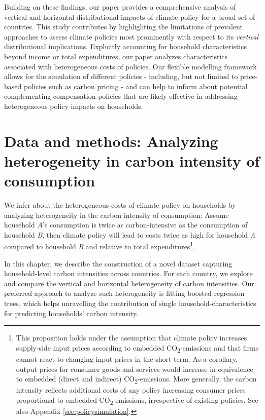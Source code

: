 \documentclass[12pt, a4paper]{article}
\begin{document}
Building on these findings, our paper provides a comprehensive analysis of vertical and horizontal distributional impacts of climate policy for a broad set of countries. This study contributes by highlighting the limitations of prevalent approaches to assess climate policies most prominently with respect to its \textit{vertical} distributional implications. Explicitly accounting for household characteristics beyond income or total expenditures, our paper analyzes characteristics associated with heterogeneous costs of policies. Our flexible modelling framework allows for the simulation of different policies - including, but not limited to price-based policies such as carbon pricing - and can help to inform about potential complementing compensation policies that are likely effective in addressing heterogeneous policy impacts on households.

\section{Data and methods: Analyzing heterogeneity in carbon intensity of consumption} \label{sec:data_methods}

We infer about the heterogeneous costs of climate policy on households by analyzing heterogeneity in the carbon intensity of consumption: Assume household \textit{A}'s consumption is twice as carbon-intensive as the consumption of household \textit{B}, then climate policy will lead to costs twice as high for household \textit{A} compared to household \textit{B} and relative to total expenditures\footnote{This proposition holds under the assumption that climate policy increases supply-side input prices according to embedded CO\textsubscript{2}-emissions and that firms cannot react to changing input prices in the short-term. As a corollary, output prices for consumer goods and services would increase in equivalence to embedded (direct and indirect) CO\textsubscript{2}-emissions. More generally, the carbon intensity reflects additional costs of any policy increasing consumer prices proportional to embedded CO\textsubscript{2}-emissions, irrespective of existing policies. See also Appendix \ref{sec:policysimulation}.}.

In this chapter, we describe the construction of a novel dataset capturing household-level carbon intensities across countries. For each country, we explore and compare the vertical and horizontal heterogeneity of carbon intensities. Our preferred approach to analyze such heterogeneity is fitting boosted regression trees, which helps unravelling the contribution of single household-characteristics for predicting households' carbon intensity.
\end{document}
